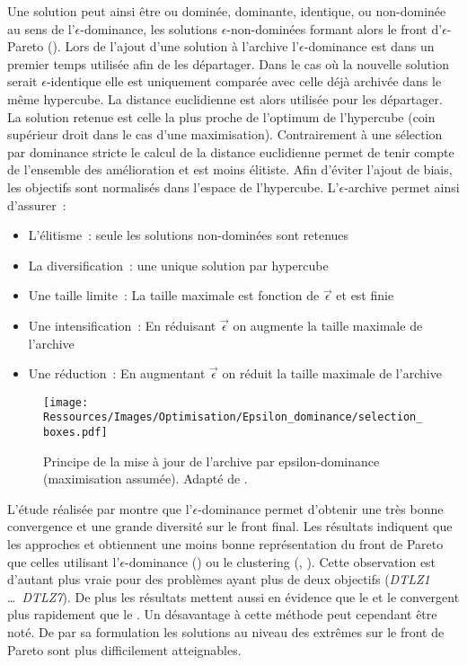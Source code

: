 Une solution peut ainsi être ou dominée, dominante, identique, ou non-dominée au sens de
l’$\epsilon$-dominance, les solutions $\epsilon$-non-dominées formant alors le front
d’$\epsilon$-Pareto (). Lors de l’ajout d’une solution à
l’archive l’$\epsilon$-dominance est dans un premier temps utilisée afin de les
départager. Dans le cas où la nouvelle solution serait $\epsilon$-identique elle est
uniquement comparée avec celle déjà archivée dans le même hypercube. La distance
euclidienne est alors utilisée pour les départager. La solution retenue est celle la plus
proche de l’optimum de l’hypercube (coin supérieur droit dans le cas d’une maximisation).
Contrairement à une sélection par dominance stricte le calcul de la distance euclidienne
permet de tenir compte de l’ensemble des amélioration et est moins élitiste. Afin d’éviter
l’ajout de biais, les objectifs sont normalisés dans l’espace de l’hypercube.
L’$\epsilon$-archive permet ainsi d’assurer~:
\begin{itemize}
  \item L’élitisme~: seule les solutions non-dominées sont retenues
  \item La diversification~: une unique solution par hypercube
  \item Une taille limite~: La taille maximale est fonction de $\vec{\epsilon}$ et est finie
  \item Une intensification~: En réduisant $\vec{\epsilon}$ on augmente la taille maximale de l’archive
  \item Une réduction~: En augmentant $\vec{\epsilon}$ on réduit la taille maximale de l’archive
\end{itemize}

\begin{figure}
    \centering
    \texttt{[image: Ressources/Images/Optimisation/Epsilon\_dominance/selection\_boxes.pdf]}
    \caption[Principe de la mise à jour de l’archive par epsilon-dominance]
            {Principe de la mise à jour de l’archive par epsilon-dominance (maximisation assumée).
             Adapté de \cite{Deb2005501}.}
    \label{fig:epsilon_dominance}
\end{figure}
L’étude réalisée par \textcite{Deb2005501} montre que l’$\epsilon$-dominance permet
d’obtenir une très bonne convergence et une grande diversité sur le front final.
Les résultats indiquent que les approches  et  obtiennent une moins
bonne représentation du front de Pareto que celles utilisant l’$\epsilon$-dominance
() ou le clustering (, ).
Cette observation est d’autant plus vraie pour des problèmes ayant plus de deux
objectifs (\textit{DTLZ1} \dots\ \textit{DTLZ7}).
De plus les résultats mettent aussi en évidence que le  et le 
convergent plus rapidement que le .
Un désavantage à cette méthode peut cependant être noté. De par sa formulation
les solutions au niveau des extrêmes sur le front de Pareto sont plus difficilement
atteignables.

